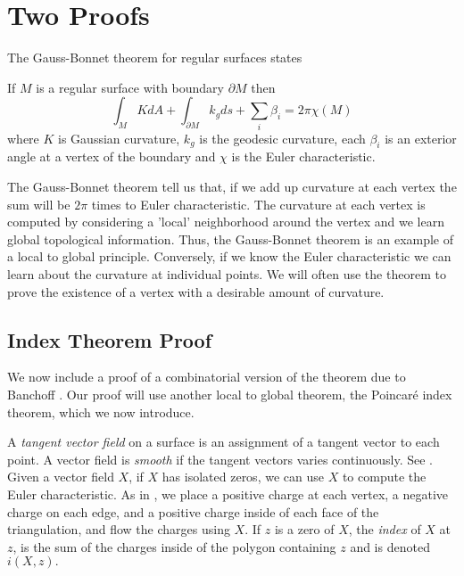 \section{Two Proofs}



The Gauss-Bonnet theorem for regular surfaces states

\begin{theorem} \label{thm:g-b-c}

If $M$ is a regular surface with boundary $\partial M$ then
	$$\int_{M} K dA+ \int_{\partial M} k_g ds + \sum_i \beta_i= 2\pi \chi(M)$$
	where  $K$ is Gaussian curvature,
	 $k_g$ is the geodesic curvature,
	 each $\beta_i$  is an exterior angle at a vertex of the boundary and
	$\chi$ is the Euler characteristic.
\end{theorem}


The  Gauss-Bonnet theorem tell us that, if we add up curvature
at each vertex the sum will be $2\pi$ times to Euler characteristic.
The curvature at each vertex is computed by considering a 'local' neighborhood
around the vertex and we learn global topological information. Thus, the Gauss-Bonnet 
theorem is an example of a local to global principle. 
Conversely, if we know the Euler characteristic we can learn about the curvature
at individual points. We will often use the theorem to prove the existence of
a vertex with a desirable amount of curvature.



\subsection{Index Theorem Proof}
We now include a proof of a combinatorial version of the theorem due to Banchoff
\cite{banchoff_critical_1970}. Our proof will use another local to global theorem,
the Poincar\'e index theorem, which we now introduce.

A \emph{tangent vector field} on a surface is an assignment of a tangent
vector to each point. A vector field is \emph{smooth} if the tangent vectors
varies continuously. See .
Given a vector field $X$, if $X$ has isolated zeros, we
can use $X$ to compute the Euler characteristic.
As in , we place a positive charge at each vertex, a negative charge on
each edge, and a positive charge inside of each face of the triangulation, and flow
the charges using $X$. If $z$ is a zero of $X$, the \emph{index} of $X$ at $z$,
is the sum of the charges inside of the polygon containing $z$ and is denoted
$i(X,z).$

